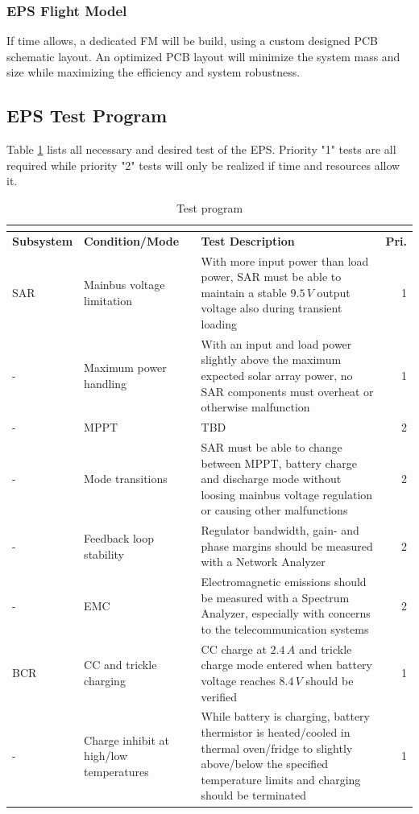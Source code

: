\subsubsection{EPS Flight Model}
If time allows, a dedicated \ac{FM} will be build, using a custom designed \ac{PCB} schematic layout. An optimized \ac{PCB} layout will minimize the system mass and size while maximizing the efficiency and system robustness.
%
\subsection{EPS Test Program}
Table \ref{tab:test_program} lists all necessary and desired test of the EPS. Priority "1" tests are all required while priority "2" tests will only be realized if time and resources allow it.
%
\begin{center}
\begin{longtable}[H]{p{}p{}p{}r}
\caption{Test program}\\
\label{tab:test_program}\\[-0.5cm]
\hline
\textbf{Subsystem} & \textbf{Condition/Mode} & \textbf{Test Description} & \textbf{Pri.}\\
\hline
\ac{SAR} & Mainbus voltage limitation & With more input power than load power, \ac{SAR} must be able to maintain a stable $9.5\,V$ output voltage also during transient loading & 1\\
- & Maximum power handling & With an input and load power slightly above the maximum expected solar array power, no \ac{SAR} components must overheat or otherwise malfunction & 1 \\
- & \ac{MPPT} & \ac{TBD} & 2\\
- & Mode transitions & \ac{SAR} must be able to change between \ac{MPPT}, battery charge and discharge mode without loosing mainbus voltage regulation or causing other malfunctions & 2\\
- & Feedback loop stability & Regulator bandwidth, gain- and phase margins should be measured with a Network Analyzer & 2\\
- & \ac{EMC} & Electromagnetic emissions should be measured with a Spectrum Analyzer, especially with concerns to the telecommunication systems & 2\\
\hline
\ac{BCR} & \ac{CC} and trickle charging & \ac{CC} charge at $2.4\,A$ and trickle charge mode entered when battery voltage reaches $8.4\,V$ should be verified & 1\\
- & Charge inhibit at high/low temperatures & While battery is charging, battery thermistor is heated/cooled in thermal oven/fridge to slightly above/below the specified temperature limits and charging should be terminated & 1\\

\end{longtable}
\end{center}
